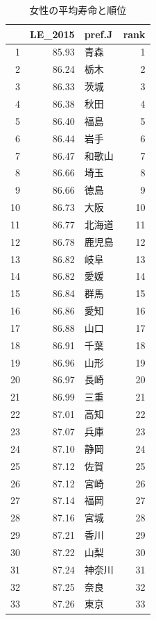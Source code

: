 \begin{table}[ht]
\caption{女性の平均寿命と順位}
\centering
\footnotesize
\begin{tabular}{rrlr}
  \hline
 & LE\_2015 & pref.J & rank \\
  \hline
1 & 85.93 & 青森 &   1 \\
  2 & 86.24 & 栃木 &   2 \\
  3 & 86.33 & 茨城 &   3 \\
  4 & 86.38 & 秋田 &   4 \\
  5 & 86.40 & 福島 &   5 \\
  6 & 86.44 & 岩手 &   6 \\
  7 & 86.47 & 和歌山 &   7 \\
  8 & 86.66 & 埼玉 &   8 \\
  9 & 86.66 & 徳島 &   9 \\
  10 & 86.73 & 大阪 &  10 \\
  11 & 86.77 & 北海道 &  11 \\
  12 & 86.78 & 鹿児島 &  12 \\
  13 & 86.82 & 岐阜 &  13 \\
  14 & 86.82 & 愛媛 &  14 \\
  15 & 86.84 & 群馬 &  15 \\
  16 & 86.86 & 愛知 &  16 \\
  17 & 86.88 & 山口 &  17 \\
  18 & 86.91 & 千葉 &  18 \\
  19 & 86.96 & 山形 &  19 \\
  20 & 86.97 & 長崎 &  20 \\
  21 & 86.99 & 三重 &  21 \\
  22 & 87.01 & 高知 &  22 \\
  23 & 87.07 & 兵庫 &  23 \\
  24 & 87.10 & 静岡 &  24 \\
  25 & 87.12 & 佐賀 &  25 \\
  26 & 87.12 & 宮崎 &  26 \\
  27 & 87.14 & 福岡 &  27 \\
  28 & 87.16 & 宮城 &  28 \\
  29 & 87.21 & 香川 &  29 \\
  30 & 87.22 & 山梨 &  30 \\
  31 & 87.24 & 神奈川 &  31 \\
  32 & 87.25 & 奈良 &  32 \\
  33 & 87.26 & 東京 &  33 \\

\end{tabular}
\end{table}
